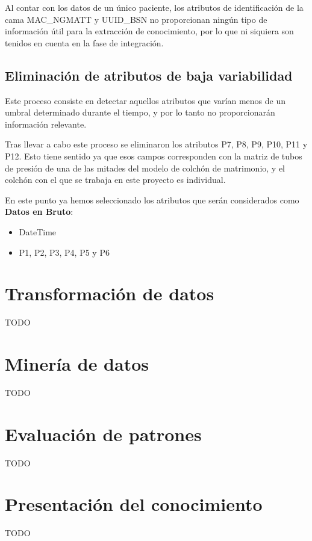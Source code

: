 Al contar con los datos de un único paciente, los atributos de identificación de la cama MAC\_NGMATT y UUID\_BSN no proporcionan ningún tipo de información útil para la extracción de conocimiento, por lo que ni siquiera son tenidos en cuenta en la fase de integración. 

\subsection{Eliminación de atributos de baja variabilidad}

Este proceso consiste en detectar aquellos atributos que varían menos de un umbral determinado durante el tiempo, y por lo tanto no proporcionarán información relevante. 

Tras llevar a cabo este proceso se eliminaron los atributos P7, P8, P9, P10, P11 y P12. Esto tiene sentido ya que esos campos corresponden con la matriz de tubos de presión de una de las mitades del modelo de colchón de matrimonio, y el colchón con el que se trabaja en este proyecto es individual. 

En este punto ya hemos seleccionado los atributos que serán considerados como \textbf{Datos en Bruto}: 
\begin{itemize}
	\item DateTime
	\item P1, P2, P3, P4, P5 y P6
\end{itemize}

\section{Transformación de datos}

TODO

\section{Minería de datos}

TODO

\section{Evaluación de patrones}

TODO

\section{Presentación del conocimiento}

TODO
